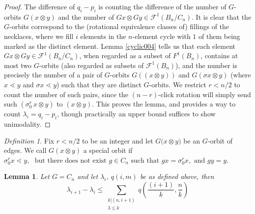 \documentclass{amsart}
\newtheorem{lem}[thm]{Lemma}
\theoremstyle{remark}
\newtheorem{defn}[thm]{Definition}
\begin{document}
\begin{proof}

 The difference of $q_i - p_i$ is counting the difference of the number of $G$-orbits $G (x \otimes y)$ and the number of $Gx \otimes Gy \in \mathcal F^1(B_n/C_n)$. It is clear that the $G$-orbits correspond to the (rotational equivalence classes of) fillings of the necklaces, where we fill $i$ elements in the  $n$-element cycle with $1$ of them being marked as the distinct element. Lemma \ref{cyclic004} tells us that each element $Gx \otimes Gy \in \mathcal F^1 (B_n/C_n)$, when regarded as a subset of $F^1(B_n)$,  contains at most two $G$-orbits (also regarded as subsets of $\mathcal F^1 (B_n)$), and the number is precisely the number of a pair of $G$-orbits $G ({(x \otimes y)})$ and $G{(\sigma x \otimes y )}$ (where $ x \lessdot y$ and $\sigma x \lessdot y$) such that they are distinct $G$-orbits. We restrict $r < n/2$  to count the number of such pairs, since the $(n -r)$-click rotation will simply send such $(\sigma_0^r \, x \otimes  y)$ to $(x \otimes y)$. This proves the lemma, and provides a way to count $\lambda_i = q_i - p_i$, though practically an upper bound suffices to show unimodality. 
\end{proof}


\begin{defn}
Fix $r < n/2$ to be an integer and let $ G({x\otimes y)}$ be an $G$-orbit of edges. We call $G(x \otimes y)$ a special orbit if  $ \sigma_0^r x \lessdot y, \, \, \text{ but  there does not exist } g \in C_n \text{ such that } g x = \sigma_0 ^r x,  \text{ and }g y = y$. 

\end{defn}

\begin{lem}{\label{lem:cyclic_bounding_lambda}} 
Let $G =C_n$ and let $\lambda_i$, $q(i,m)$ be as defined above,  then $$\lambda_{i+1} - \lambda_i \le \sum_{\substack{k | (n , i+1) \\ 3 \le k }} q (\frac{(i+1)}{k},\frac{n}{k}) $$ 
\end{lem}
\end{document}
